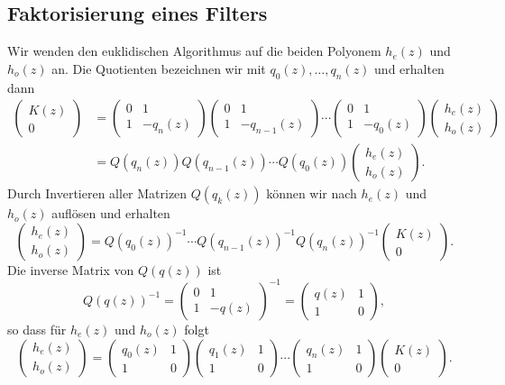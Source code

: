 \subsection{Faktorisierung eines Filters}
Wir wenden den euklidischen Algorithmus auf die beiden Polyonem $h_e(z)$
und $h_o(z)$ an.
Die Quotienten bezeichnen wir mit $q_0(z),\dots,q_n(z)$ und erhalten dann
\begin{align*}
\begin{pmatrix} K(z) \\ 0 \end{pmatrix}
&=
\begin{pmatrix} 0&1\\ 1&-q_n(z) \end{pmatrix}
\begin{pmatrix} 0&1\\ 1&-q_{n-1}(z) \end{pmatrix}
\cdots
\begin{pmatrix} 0&1\\ 1&-q_0(z) \end{pmatrix}
\begin{pmatrix} h_e(z)\\h_o(z)\end{pmatrix}
\\
&=
Q(q_n(z))
Q(q_{n-1}(z))
\cdots
Q(q_0(z))
\begin{pmatrix} h_e(z)\\h_o(z)\end{pmatrix}.
\end{align*}
Durch Invertieren aller Matrizen $Q(q_k(z))$ können wir nach $h_e(z)$
und $h_o(z)$ auflösen und erhalten
\[
\begin{pmatrix} h_e(z)\\h_o(z)\end{pmatrix}
=
Q(q_0(z))^{-1}
\cdots
Q(q_{n-1}(z))^{-1}
Q(q_n(z))^{-1}
\begin{pmatrix}K(z)\\0\end{pmatrix}.
\]
Die inverse Matrix von $Q(q(z))$ ist
\[
Q(q(z))^{-1}
= 
\begin{pmatrix}
0&1\\
1&-q(z)
\end{pmatrix}^{-1}
=
\begin{pmatrix}
q(z)&1\\
1&0
\end{pmatrix},
\]
so dass für $h_e(z)$ und $h_o(z)$ folgt
\[
\begin{pmatrix} h_e(z)\\h_o(z)\end{pmatrix}
=
\begin{pmatrix} q_0(z)&1\\1&0 \end{pmatrix}
\begin{pmatrix} q_1(z)&1\\1&0 \end{pmatrix}
\cdots
\begin{pmatrix} q_n(z)&1\\1&0 \end{pmatrix}
\begin{pmatrix} K(z) \\ 0 \end{pmatrix}.
\]

